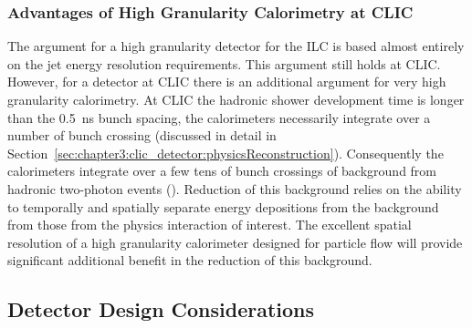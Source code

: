 \subsubsection{Advantages of High Granularity Calorimetry at CLIC}

The argument for a high granularity detector for the ILC is based almost
entirely on the jet energy resolution requirements. This argument still holds at
CLIC\@. However, for a detector at CLIC there is an additional argument for very
high granularity calorimetry. At CLIC the hadronic shower development time
is longer than the 0.5~ns bunch spacing, the calorimeters
necessarily integrate over a number of bunch crossing (discussed in detail in
Section~\ref{sec:chapter3:clic_detector:physicsReconstruction}). Consequently the
calorimeters integrate over a few tens of bunch crossings of background from hadronic
two-photon events (\gghadrons). Reduction of this
background relies on the ability to temporally and spatially separate energy
depositions from the background from those from the physics interaction of
interest. The excellent spatial resolution of a high granularity calorimeter
designed for particle flow will provide significant additional benefit in the
reduction of this background.


\subsection{Detector Design Considerations\label{sec:chapter3:concepts:design}}


